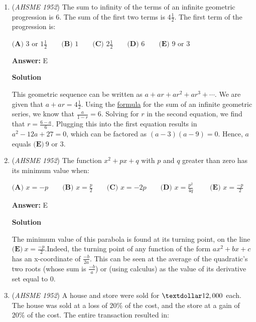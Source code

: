 \begin{enumerate}
	\item (\textit{AHSME 1952}) The sum to infinity of the terms of an infinite geometric progression is $6$. The sum of the first two terms is $4\frac{1}{2}$. The first term of the progression is:


 $\textbf{(A) \ }3 \text{ or } 1\frac{1}{2}  \qquad \textbf{(B) \ }1 \qquad \textbf{(C) \ }2\frac{1}{2} \qquad \textbf{(D) \ }6 \qquad \textbf{(E) \ }9\text{ or }3$

 \textbf{Answer: }E



\textbf{Solution}

This geometric sequence can be written as $a+ar+ar^2+ar^3+\cdots$. We are given that $a+ar=4\frac{1}{2}$. Using the \href{https://artofproblemsolving.com/wiki/index.php?title=Geometric\_sequence\#Infinite\_Geometric\_Sequences}{formula} for the sum of an infinite geometric series, we know that $\frac{a}{1-r}=6$. Solving for $r$ in the second equation, we find that $r=\frac{6-a}{6}$. Plugging this into the first equation results in $a^2-12a+27=0$, which can be factored as $(a-3)(a-9)=0$. Hence, $a$ equals $\boxed{\textbf{(E)}\ 9 \text{ or }3}$.

 


	\item (\textit{AHSME 1952}) The function $x^2+px+q$ with $p$ and $q$ greater than zero has its minimum value when:


 $\textbf{(A) \ }x=-p  \qquad \textbf{(B) \ }x=\frac{p}{2} \qquad \textbf{(C) \ }x=-2p \qquad \textbf{(D) \ }x=\frac{p^2}{4q} \qquad$
$\textbf{(E) \ }x=\frac{-p}{2}$

 \textbf{Answer: }E



\textbf{Solution}

The minimum value of this parabola is found at its turning point, on the line $\boxed{\textbf{(E)}\ x=\frac{-p}{2}}$.Indeed, the turning point of any function of the form $ax^2+bx+c$ has an x-coordinate of $\frac{-b}{2a}$. This can be seen at the average of the quadratic's two roots (whose sum is $\frac{-b}{a}$) or (using calculus) as the value of its derivative set equal to $0$.

 


	\item (\textit{AHSME 1952}) A house and store were sold for $\textdollar 12,000$ each. The house was sold at a loss of $20\%$ of the cost, and the store at a gain of $20\%$ of the cost. The entire transaction resulted in:



\end{enumerate}
